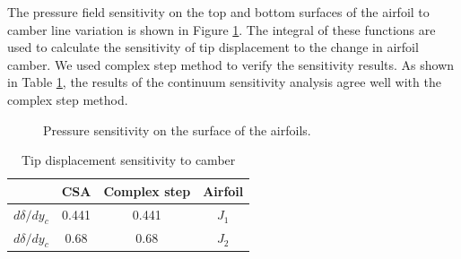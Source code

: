 \documentclass[12pt]{aiaa-pretty}
\begin{document}
The pressure field sensitivity on the top and bottom surfaces of the airfoil to camber line variation is shown in Figure \ref{fig:joukowskiChamberSensitivity}. The integral of these functions are used to calculate the sensitivity of tip displacement to the change in airfoil camber. We used complex step method to verify the sensitivity results. As shown in Table \ref{table:sensitivity}, the results of the continuum sensitivity analysis agree well with the complex step method.

%
	\begin{figure}[H]
		\centering
		\quad
		\caption{Pressure sensitivity on the surface of the airfoils.}
		\label{fig:joukowskiChamberSensitivity}
	\end{figure}
%

%
\begin{table}[H]
\centering
\begin{tabular}{c|c|c|c}
 & \multicolumn{1}{c|}{CSA} & \multicolumn{1}{c|}{Complex step} & Airfoil \\ \hline
$d\delta/dy_c$ & 0.441 & 0.441 & $J_1$ \\ \hline
$d\delta/dy_c$ & 0.68 & 0.68 & $J_2$ \\
\end{tabular}
\caption{Tip displacement sensitivity to camber}
\label{table:sensitivity}
\end{table}
%
\end{document}
